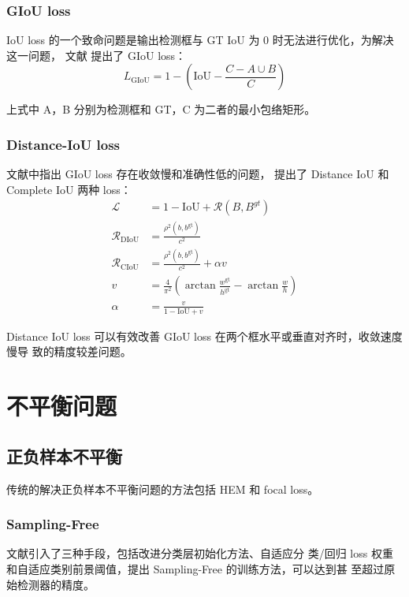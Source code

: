 \subsubsection{GIoU loss}
IoU loss 的一个致命问题是输出检测框与 GT IoU 为 0 时无法进行优化，为解决这一问题，
文献 提出了 GIoU loss：
\begin{equation}
  L_{\mathrm{GIoU}} = 1 - \left( \mathrm{IoU} - \frac{C - A \cup B}{C} \right)
\end{equation}

上式中 A，B 分别为检测框和 GT，C 为二者的最小包络矩形。

\subsubsection{Distance-IoU loss}
文献中指出 GIoU loss 存在收敛慢和准确性低的问题，
提出了 Distance IoU 和 Complete IoU 两种 loss：
\begin{align}
  \mathcal{L} & = 1 - \mathrm{IoU} + \mathcal{R}(B, B^{gt}) \\
  \mathcal{R}_{\mathrm{DIoU}} & = \frac{\rho^2(b, b^{\mathrm{gt}})}{c^2} \\
  \mathcal{R}_{\mathrm{CIoU}} & = \frac{\rho^2(b, b^{\mathrm{gt}})}{c^2} + \alpha v \\
  v & = \frac{4}{\pi^2}\left( \arctan\frac{w^{\mathrm{gt}}}{h^{\mathrm{gt}}} - \arctan \frac{w}{h} \right) \\
  \alpha & = \frac{v}{1 - \mathrm{IoU} + v}
\end{align}

Distance IoU loss 可以有效改善 GIoU loss 在两个框水平或垂直对齐时，收敛速度慢导
致的精度较差问题。

\section{不平衡问题}
\subsection{正负样本不平衡}

传统的解决正负样本不平衡问题的方法包括 HEM 和 focal loss。

\subsubsection{Sampling-Free}
文献引入了三种手段，包括改进分类层初始化方法、自适应分
类/回归 loss 权重和自适应类别前景阈值，提出 Sampling-Free 的训练方法，可以达到甚
至超过原始检测器的精度。

